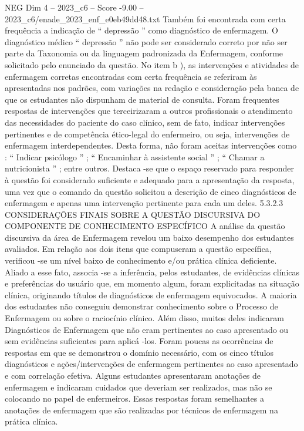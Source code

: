 \begin{textsample}{NEG Dim 4 – 2023\_c6 – Score -9.00 – 2023\_c6/enade\_2023\_enf\_e0eb49dd48.txt}
Também foi encontrada com certa frequência a indicação de “ depressão ” como diagnóstico de enfermagem.
O diagnóstico médico “ depressão ” não pode ser considerado correto por não ser parte da Taxonomia ou da linguagem padronizada da Enfermagem, conforme solicitado pelo enunciado da questão.
No item b ), as intervenções e atividades de enfermagem corretas encontradas com certa frequência se referiram às apresentadas nos padrões, com variações na redação e consideração pela banca de que os estudantes não dispunham de material de consulta.
Foram frequentes respostas de intervenções que terceirizaram a outros profissionais o atendimento das necessidades do paciente do caso clínico, sem de fato, indicar intervenções pertinentes e de competência ético-legal do enfermeiro, ou seja, intervenções de enfermagem interdependentes.
Desta forma, não foram aceitas intervenções como : “ Indicar psicólogo ” ; “ Encaminhar à assistente social ” ; “ Chamar a nutricionista ” ; entre outros.
Destaca -se que o espaço reservado para responder à questão foi considerado suficiente e adequado para a apresentação da resposta, uma vez que o comando da questão solicitou a descrição de cinco diagnósticos de enfermagem e apenas uma intervenção pertinente para cada um deles. 5.3.2.3 CONSIDERAÇÕES FINAIS SOBRE A QUESTÃO DISCURSIVA DO COMPONENTE DE CONHECIMENTO ESPECÍFICO A análise da questão discursiva da área de Enfermagem revelou um baixo desempenho dos estudantes avaliados.
Em relação aos dois itens que compuseram a questão específica, verificou -se um nível baixo de conhecimento e/ou prática clínica deficiente.
Aliado a esse fato, associa -se a inferência, pelos estudantes, de evidências clínicas e preferências do usuário que, em momento algum, foram explicitadas na situação clínica, originando títulos de diagnósticos de enfermagem equivocados.
A maioria dos estudantes não conseguiu demonstrar conhecimento sobre o Processo de Enfermagem ou sobre o raciocínio clínico.
Além disso, muitos deles indicaram Diagnósticos de Enfermagem que não eram pertinentes ao caso apresentado ou sem evidências suficientes para aplicá -los.
Foram poucas as ocorrências de respostas em que se demonstrou o domínio necessário, com os cinco títulos diagnósticos e ações/intervenções de enfermagem pertinentes ao caso apresentado e com correlação efetiva.
Alguns estudantes apresentaram anotações de enfermagem e indicaram cuidados que deveriam ser realizados, mas não se colocando no papel de enfermeiros.
Essas respostas foram semelhantes a anotações de enfermagem que são realizadas por técnicos de enfermagem na prática clínica.

\end{textsample}
